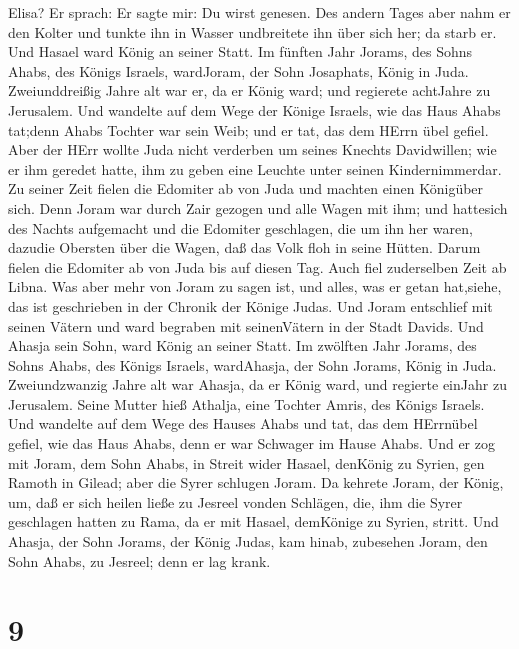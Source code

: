 Elisa? Er sprach: Er sagte mir: Du wirst genesen.  Des
andern Tages aber nahm er den Kolter und tunkte ihn in Wasser
undbreitete ihn über sich her; da starb er. Und Hasael ward König an
seiner Statt.  Im fünften Jahr Jorams, des Sohns Ahabs, des
Königs Israels, wardJoram, der Sohn Josaphats, König in Juda.
 Zweiunddreißig Jahre alt war er, da er König ward; und
regierete achtJahre zu Jerusalem.  Und wandelte auf dem
Wege der Könige Israels, wie das Haus Ahabs tat;denn Ahabs Tochter war
sein Weib; und er tat, das dem HErrn übel gefiel.  Aber der
HErr wollte Juda nicht verderben um seines Knechts Davidwillen; wie er
ihm geredet hatte, ihm zu geben eine Leuchte unter seinen
Kindernimmerdar.  Zu seiner Zeit fielen die Edomiter ab von
Juda und machten einen Königüber sich.  Denn Joram war
durch Zair gezogen und alle Wagen mit ihm; und hattesich des Nachts
aufgemacht und die Edomiter geschlagen, die um ihn her waren, dazudie
Obersten über die Wagen, daß das Volk floh in seine Hütten.
 Darum fielen die Edomiter ab von Juda bis auf diesen Tag.
Auch fiel zuderselben Zeit ab Libna.  Was aber mehr von
Joram zu sagen ist, und alles, was er getan hat,siehe, das ist
geschrieben in der Chronik der Könige Judas.  Und Joram
entschlief mit seinen Vätern und ward begraben mit seinenVätern in der
Stadt Davids. Und Ahasja sein Sohn, ward König an seiner Statt.
 Im zwölften Jahr Jorams, des Sohns Ahabs, des Königs
Israels, wardAhasja, der Sohn Jorams, König in Juda. 
Zweiundzwanzig Jahre alt war Ahasja, da er König ward, und regierte
einJahr zu Jerusalem. Seine Mutter hieß Athalja, eine Tochter Amris, des
Königs Israels.  Und wandelte auf dem Wege des Hauses Ahabs
und tat, das dem HErrnübel gefiel, wie das Haus Ahabs, denn er war
Schwager im Hause Ahabs.  Und er zog mit Joram, dem Sohn
Ahabs, in Streit wider Hasael, denKönig zu Syrien, gen Ramoth in Gilead;
aber die Syrer schlugen Joram.  Da kehrete Joram, der
König, um, daß er sich heilen ließe zu Jesreel vonden Schlägen, die, ihm
die Syrer geschlagen hatten zu Rama, da er mit Hasael, demKönige zu
Syrien, stritt. Und Ahasja, der Sohn Jorams, der König Judas, kam hinab,
zubesehen Joram, den Sohn Ahabs, zu Jesreel; denn er lag krank.

\hypertarget{section-8}{%
\section{9}\label{section-8}}

